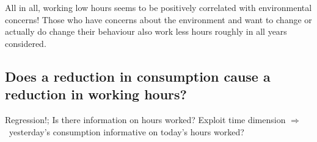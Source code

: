 \documentclass[12pt]{article}
\newcommand{\ar}{$\Rightarrow$ \ }
\begin{document}
All in all, working low hours seems to be positively correlated with environmental concerns! Those who have concerns about the environment and want to change or actually do change their behaviour also work less hours roughly in all years considered.

\subsection{Does a reduction in consumption cause a reduction in working hours?}
Regression!; Is there information on hours worked?
Exploit time dimension \ar yesterday's consumption informative on today's hours worked?
\clearpage

\end{document}
